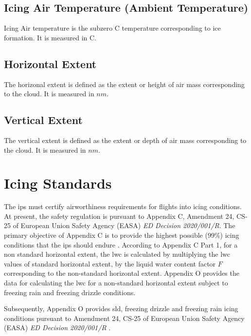 \documentclass[english]{kththesis}
\begin{document}
\subsection{Icing Air Temperature (Ambient Temperature)}
\label{subsec:iceairtemp}
Icing Air temperature is the subzero \degree C temperature corresponding to ice formation. It is measured in \degree C.
\subsection{Horizontal Extent}
The horizonal extent is defined as the extent or height of air mass corresponding to the cloud. It is measured in $nm$. 

\subsection{Vertical Extent}
The vertical extent is defined as the extent or depth of air mass corresponding to the cloud. It is measured in $nm$. 

\section{Icing Standards}
\label{subsec:icestd}
The \acrshort{ips} must certify airworthiness requirements for flights into icing conditions. At present, the safety regulation is pursuant to Appendix C, Amendment 24, CS-25 of European Union Safety Agency (EASA) \textit{ED Decision 2020/001/R}. The primary objective of Appendix C is to provide the highest possible (99\%) icing conditions that the \acrshort{ips} should endure . According to Appendix C Part 1, for a non standard horizontal extent, the \acrshort{lwc} is calculated by multiplying the \acrshort{lwc} values of standard horizontal extent, by the liquid water content factor $F$ corresponding to the non-standard horizontal extent. Appendix O provides the data for calculating the \acrshort{lwc} for a non-standard horizontal extent subject to freezing rain and freezing drizzle conditions.

Subsequently, Appendix O provides \acrshort{sld}, freezing drizzle and freezing rain icing conditions pursuant to Amendment 24, CS-25 of European Union Safety Agency (EASA) \textit{ED Decision 2020/001/R} \cite{EuropeanAviationSafetyAgency2020}.
\end{document}
